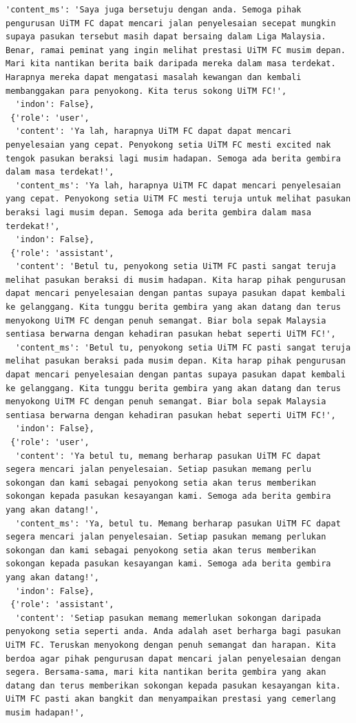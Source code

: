 \documentclass{article}
\begin{document}
\begin{lstlisting}[breaklines=true]
  'content_ms': 'Saya juga bersetuju dengan anda. Semoga pihak pengurusan UiTM FC dapat mencari jalan penyelesaian secepat mungkin supaya pasukan tersebut masih dapat bersaing dalam Liga Malaysia. Benar, ramai peminat yang ingin melihat prestasi UiTM FC musim depan. Mari kita nantikan berita baik daripada mereka dalam masa terdekat. Harapnya mereka dapat mengatasi masalah kewangan dan kembali membanggakan para penyokong. Kita terus sokong UiTM FC!',
  'indon': False},
 {'role': 'user',
  'content': 'Ya lah, harapnya UiTM FC dapat dapat mencari penyelesaian yang cepat. Penyokong setia UiTM FC mesti excited nak tengok pasukan beraksi lagi musim hadapan. Semoga ada berita gembira dalam masa terdekat!',
  'content_ms': 'Ya lah, harapnya UiTM FC dapat mencari penyelesaian yang cepat. Penyokong setia UiTM FC mesti teruja untuk melihat pasukan beraksi lagi musim depan. Semoga ada berita gembira dalam masa terdekat!',
  'indon': False},
 {'role': 'assistant',
  'content': 'Betul tu, penyokong setia UiTM FC pasti sangat teruja melihat pasukan beraksi di musim hadapan. Kita harap pihak pengurusan dapat mencari penyelesaian dengan pantas supaya pasukan dapat kembali ke gelanggang. Kita tunggu berita gembira yang akan datang dan terus menyokong UiTM FC dengan penuh semangat. Biar bola sepak Malaysia sentiasa berwarna dengan kehadiran pasukan hebat seperti UiTM FC!',
  'content_ms': 'Betul tu, penyokong setia UiTM FC pasti sangat teruja melihat pasukan beraksi pada musim depan. Kita harap pihak pengurusan dapat mencari penyelesaian dengan pantas supaya pasukan dapat kembali ke gelanggang. Kita tunggu berita gembira yang akan datang dan terus menyokong UiTM FC dengan penuh semangat. Biar bola sepak Malaysia sentiasa berwarna dengan kehadiran pasukan hebat seperti UiTM FC!',
  'indon': False},
 {'role': 'user',
  'content': 'Ya betul tu, memang berharap pasukan UiTM FC dapat segera mencari jalan penyelesaian. Setiap pasukan memang perlu sokongan dan kami sebagai penyokong setia akan terus memberikan sokongan kepada pasukan kesayangan kami. Semoga ada berita gembira yang akan datang!',
  'content_ms': 'Ya, betul tu. Memang berharap pasukan UiTM FC dapat segera mencari jalan penyelesaian. Setiap pasukan memang perlukan sokongan dan kami sebagai penyokong setia akan terus memberikan sokongan kepada pasukan kesayangan kami. Semoga ada berita gembira yang akan datang!',
  'indon': False},
 {'role': 'assistant',
  'content': 'Setiap pasukan memang memerlukan sokongan daripada penyokong setia seperti anda. Anda adalah aset berharga bagi pasukan UiTM FC. Teruskan menyokong dengan penuh semangat dan harapan. Kita berdoa agar pihak pengurusan dapat mencari jalan penyelesaian dengan segera. Bersama-sama, mari kita nantikan berita gembira yang akan datang dan terus memberikan sokongan kepada pasukan kesayangan kita. UiTM FC pasti akan bangkit dan menyampaikan prestasi yang cemerlang musim hadapan!',

\end{lstlisting}
\end{document}

